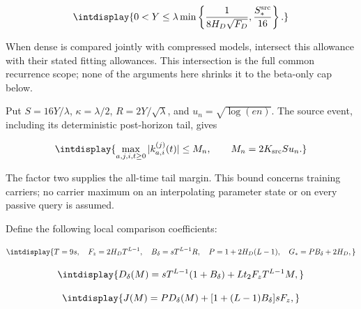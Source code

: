 \begingroup\renewcommand{\theHequation}{intdisplay.60}
\begin{equation*}
\intdisplay{
0<Y\le\lambda\min\left\{
\frac1{8H_D\sqrt{F_D}},\frac{S_*^{\rm src}}{16}\right\}.
}
\end{equation*}
\endgroup


When dense is compared jointly with compressed models, intersect this allowance with their stated fitting allowances. This intersection is the full common recurrence scope; none of the arguments here shrinks it to the beta-only cap below.



Put \(S=16Y/\lambda\), \(\kappa=\lambda/2\), \(R=2Y/\sqrt\lambda\), and \(u_n=\sqrt{\log(en)}\). The source event, including its deterministic post-horizon tail, gives


\begingroup\renewcommand{\theHequation}{intdisplay.61}
\begin{equation*}
\intdisplay{
\max_{a,j,i,t\ge0}|k_{a,i}^{(j)}(t)|\le M_n,
\qquad M_n=2K_{\rm src}S u_n.
}
\end{equation*}
\endgroup


The factor two supplies the all-time tail margin. This bound concerns training carriers; no carrier maximum on an interpolating parameter state or on every passive query is assumed.



Define the following local comparison coefficients:


\begingroup\renewcommand{\theHequation}{intdisplay.62}
\begin{equation*}
\intdisplay{
T=9s,\quad F_z=2H_DT^{L-1},\quad B_\delta=sT^{L-1}R,
\quad P=1+2H_D(L-1),\quad G_*=PB_\delta+2H_D,
}
\end{equation*}
\endgroup

\begingroup\renewcommand{\theHequation}{intdisplay.63}
\begin{equation*}
\intdisplay{
D_\delta(M)=sT^{L-1}(1+B_\delta)+Lt_2F_zT^{L-1}M,
}
\end{equation*}
\endgroup

\begingroup\renewcommand{\theHequation}{intdisplay.64}
\begin{equation*}
\intdisplay{
J(M)=P D_\delta(M)+[1+(L-1)B_\delta]sF_z,
}
\end{equation*}
\endgroup

